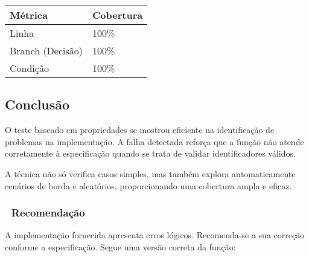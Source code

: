 \documentclass[
  letterpaper,
  DIV=11,
  numbers=noendperiod]{scrartcl}
\begin{document}
\begin{longtable}[]{@{}ll@{}}
\toprule\noalign{}
Métrica & Cobertura \\
\midrule\noalign{}
\endhead
\bottomrule\noalign{}
\endlastfoot
Linha & 100\% \\
Branch (Decisão) & 100\% \\
Condição & 100\% \\
\end{longtable}

\subsection{Conclusão}\label{conclusuxe3o}

O teste baseado em propriedades se mostrou eficiente na identificação de
problemas na implementação. A falha detectada reforça que a função não
atende corretamente à especificação quando se trata de validar
identificadores válidos.

A técnica não só verifica casos simples, mas também explora
automaticamente cenários de borda e aleatórios, proporcionando uma
cobertura ampla e eficaz.

\subsubsection{\texorpdfstring{🔧
\textbf{Recomendação}}{🔧 Recomendação}}\label{recomendauxe7uxe3o}

A implementação fornecida apresenta erros lógicos. Recomenda-se a sua
correção conforme a especificação. Segue uma versão correta da função:
\end{document}
